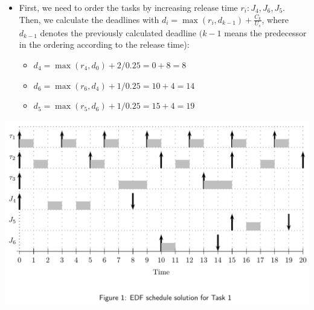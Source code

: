 \begin{frame}[allowframebreaks]{}{}
  \begin{solution}
    \begin{itemize}
      \item First, we need to order the tasks by increasing release time $r_i: J_4, J_6, J_5$. Then, we calculate the deadlines with $d_i=\max \left(r_i, d_{k-1}\right)+\frac{C_k}{U_s}$, where $d_{k-1}$ denotes the previously calculated deadline $(k-1$ means the predecessor in the ordering according to the release time):
  \begin{itemize}
    \item $d_4=\max \left(r_4, d_0\right)+2 / 0.25=0+8=8$
    \item $d_6=\max \left(r_6, d_4\right)+1 / 0.25=10+4=14$
    \item $d_5=\max \left(r_5, d_6\right)+1 / 0.25=15+4=19$
  \end{itemize}
    \end{itemize}
  \end{solution}
  \begin{solution}
    \centering
    \includegraphics[height=0.6\paperheight]{./figures/1_sol.png}
  \end{solution}
\end{frame}

